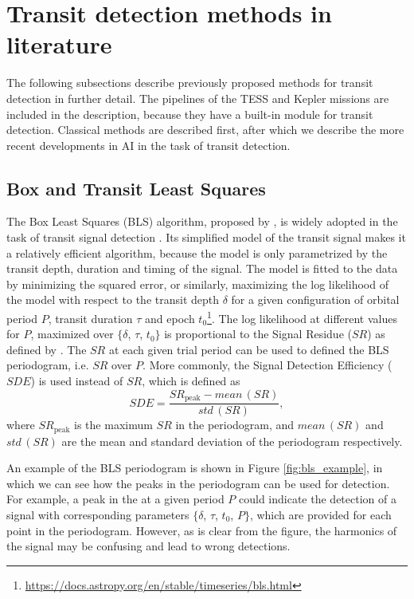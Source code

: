 
\section{Transit detection methods in literature}
\label{sec:detection_lit}

The following subsections describe previously proposed methods for transit detection in further detail. The pipelines of the TESS and Kepler missions are included in the description, because they have a built-in module for transit detection. Classical methods are described first, after which we describe the more recent developments in AI in the task of transit detection.

\subsection{Box and Transit Least Squares}

The Box Least Squares (BLS) algorithm, proposed by \cite{kovacs2002box}, is widely adopted in the task of transit signal detection . Its simplified model of the transit signal makes it a relatively efficient algorithm, because the model is only parametrized by the transit depth, duration and timing of the signal. The model is fitted to the data by minimizing the squared error, or similarly, maximizing the log likelihood of the model with respect to the transit depth $\delta$ for a given configuration of orbital period $P$, transit duration $\tau$ and epoch $t_0$\footnote{\url{https://docs.astropy.org/en/stable/timeseries/bls.html}}. The log likelihood at different values for $P$, maximized over $\{\delta$, $\tau$, $t_0\}$ is proportional to the Signal Residue ($SR$) as defined by \cite{kovacs2002box}. The $SR$ at each given trial period can be used to defined the BLS periodogram, i.e. $SR$ over $P$. More commonly, the Signal Detection Efficiency ($SDE$) is used instead of $SR$, which is defined as
\begin{equation}
    SDE = \frac{SR_{\text{peak}} - \textit{mean}\,(SR)} {\textit{std}\,(SR)},
\end{equation}
where $SR_{\text{peak}}$ is the maximum $SR$ in the periodogram, and $\textit{mean}\,(SR)$ and $\textit{std}\,(SR)$ are the mean and standard deviation of the periodogram respectively.

An example of the BLS periodogram is shown in Figure \ref{fig:bls_example}, in which we can see how the peaks in the periodogram can be used for detection. For example, a peak in the at a given period $P$ could indicate the detection of a signal with corresponding parameters $\{\delta$, $\tau$, $t_0$, $P\}$, which are provided for each point in the periodogram. However, as is clear from the figure, the harmonics of the signal may be confusing and lead to wrong detections.

